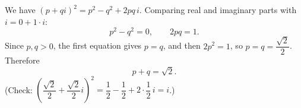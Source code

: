 We have $(p+qi)^2=p^2-q^2+2pq\,i$. Comparing real and imaginary parts with $i=0+1\cdot i$:
\[p^2-q^2=0,\qquad 2pq=1 .\]
Since $p,q>0$, the first equation gives $p=q$, and then $2p^2=1$, so $p=q=\dfrac{\sqrt2}{2}$. Therefore
\[p+q=\boxed{\sqrt2}.\]
(Check: $\left(\dfrac{\sqrt2}{2}+\dfrac{\sqrt2}{2}i\right)^2=\dfrac{1}{2}-\dfrac{1}{2}+2\cdot\dfrac{1}{2}\,i=i$.)
